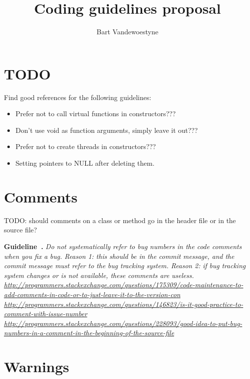 \documentclass{article}
\title{Coding guidelines proposal}
\author{Bart Vandewoestyne}
\newcounter{guideline}
\newenvironment{guideline}[1][]{\refstepcounter{guideline}\par\medskip
   \noindent \textbf{Guideline~\theguideline. #1} \em \rmfamily}{\medskip}
\begin{document}
	

\maketitle

\tableofcontents

\section{TODO}

Find good references for the following guidelines:
\begin{itemize}
\item Prefer not to call virtual functions in constructors???
\item Don't use void as function arguments, simply leave it out???
\item Prefer not to create threads in constructors???
\item Setting pointers to NULL after deleting them.
\end{itemize}

\section{Comments}

TODO: should comments on a class or method go in the header file or in the source file?

\begin{guideline}
Do not systematically refer to bug numbers in the code comments when you fix a bug.
Reason 1: this should be in the commit message, and the commit message must refer to the bug tracking system.
Reason 2: if bug tracking system changes or is not available, these comments are useless.
\url{http://programmers.stackexchange.com/questions/175309/code-maintenance-to-add-comments-in-code-or-to-just-leave-it-to-the-version-con}
\url{http://programmers.stackexchange.com/questions/146823/is-it-good-practice-to-comment-with-issue-number}
\url{http://programmers.stackexchange.com/questions/228093/good-idea-to-put-bug-numbers-in-a-comment-in-the-beginning-of-the-source-file}
\end{guideline}

\section{Warnings}
\end{document}
